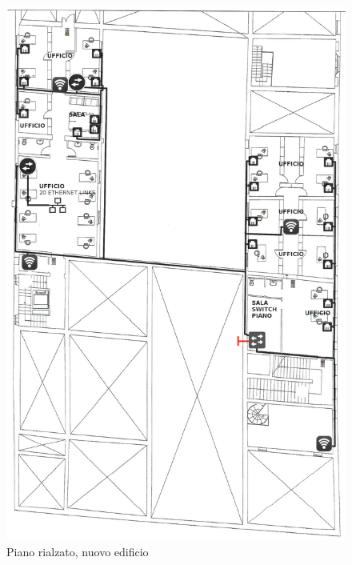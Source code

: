 \documentclass[11pt, a4paper, oneside]{article}
\begin{document}
			\begin{figure}[H]
				\caption{Piano rialzato, nuovo edificio}
				\includegraphics[scale=0.2]{architecture-005.png}
			\end{figure}
\end{document}

